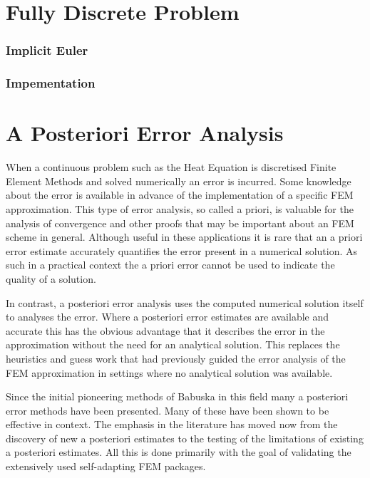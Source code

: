 \documentclass{uonmathreport}
\theoremstyle{definition}
\theoremstyle{problem}
\theoremstyle{theorem}
\begin{document}
\newpage


\section{Fully Discrete Problem} \label{sec:Fully Discrete}

\subsubsection{Implicit Euler} \label{subsubsec:Implicit Euler}


\subsubsection{Impementation} \label{subsubsec:Implementation}

\newpage

\section{A Posteriori Error Analysis} \label{sec:Errors}

When a continuous problem such as the Heat Equation is discretised Finite Element Methods and solved numerically an error is incurred. Some knowledge about the error is available in advance of the implementation of a specific FEM approximation. This type of error analysis, so called a priori, is valuable for the analysis of convergence and other proofs that may be important about an FEM scheme in general. Although useful in these applications it is rare that an a priori error estimate accurately quantifies the error present in a numerical solution. As such in a practical context the a priori error cannot be used to indicate the quality of a solution. 

In contrast, a posteriori error analysis uses the computed numerical solution itself to analyses the error. Where a posteriori error estimates are available and accurate this has the obvious advantage that it describes the error in the approximation without the need for an analytical solution. This replaces the heuristics and guess work that had previously guided the error analysis of the FEM approximation in settings where no analytical solution was available. 

Since the initial pioneering methods of Babuska \cite{babuska1978posteriori} \cite{babuska1981posteriori} in this field many a posteriori error methods have been presented. Many of these have been shown to be effective in context. The emphasis in the literature has moved now from the discovery of new a posteriori estimates to the testing of the limitations of existing a posteriori estimates. All this is done primarily with the goal of validating the extensively used self-adapting FEM packages.
\end{document}
